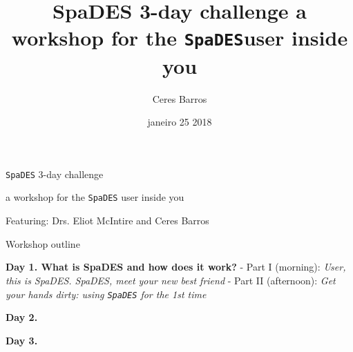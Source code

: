\documentclass[ignorenonframetext,]{beamer}
\title{SpaDES 3-day challenge a workshop for the \texttt{SpaDES}user inside you}
\author{Ceres Barros}
\date{janeiro 25 2018}
\begin{document}
\frame{\titlepage}

\begin{frame}[fragile]{\texttt{SpaDES} 3-day challenge}

a workshop for the \texttt{SpaDES} user inside you

Featuring: Drs. Eliot McIntire and Ceres Barros

\begin{block}{Workshop outline}

\textbf{Day 1. What is SpaDES and how does it work?} - Part I (morning):
\emph{User, this is SpaDES. SpaDES, meet your new best friend} - Part II
(afternoon): \emph{Get your hands dirty: using \texttt{SpaDES} for the
1st time}

\textbf{Day 2.}

\textbf{Day 3.}

\end{block}

\end{frame}
\end{document}
